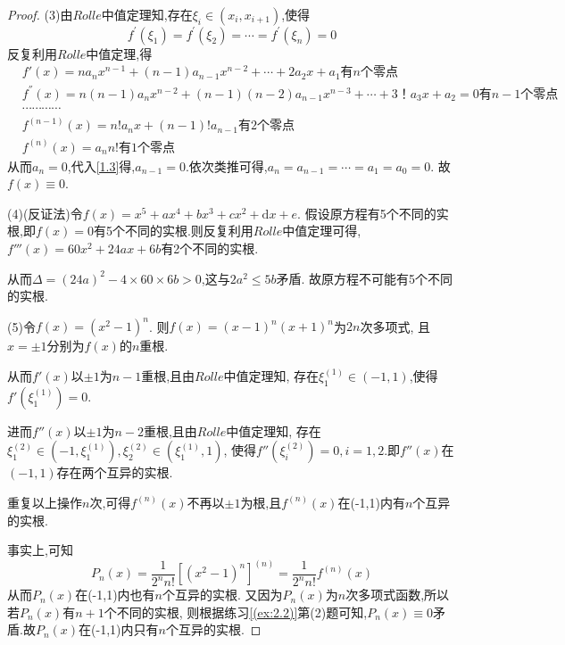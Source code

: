 \documentclass[lang=cn,newtx,10pt,scheme=chinese]{../Template/elegantbook}
\begin{document}
\begin{exercise}
\begin{proof}
    (3)由$Rolle$中值定理知,存在$\xi_i\in(x_i,x_{i+1})$,使得
    \begin{equation}
        f^{\prime}\left( \xi _1 \right) =f^{\prime}\left( \xi _2 \right) =\cdots =f^{\prime}\left( \xi _n \right) =0
        \nonumber
    \end{equation}
    反复利用$Rolle$中值定理,得
    \begin{align}
            &f'\left( x \right) =na_nx^{n-1}+\left( n-1 \right) a_{n-1}x^{n-2}+\cdots +2a_2x+a_1\text{有}n\text{个零点}
            \\
            &f^{''}(x)=n\left( n-1 \right) a_nx^{n-2}+\left( n-1 \right) \left( n-2 \right) a_{n-1}x^{n-3}+\cdots +3\text{！}a_3x+a_2=0\text{有}n-1\text{个零点}
            \\
            &\cdots \cdots \cdots \cdots \nonumber
            \\
            &f^{(n-1)}(x)=n!a_nx+\left( n-1 \right) !a_{n-1}\text{有}2\text{个零点} \label{1.3}
            \\
            &f^{(n)}(x)=a_nn!\text{有}1\text{个零点}
    \end{align}
    从而$a_n=0$,代入\eqref{1.3}得,$a_{n-1}=0$.依次类推可得,$a_n=a_{n-1}=\cdots=a_1=a_0=0$.
    故$f(x)\equiv 0$.

    (4)(反证法)令$f(x)=x^5+ax^4+bx^3+cx^2+\mathrm{d}x+e$.
    假设原方程有5个不同的实根,即$f(x)=0$有5个不同的实根.则反复利用$Rolle$中值定理可得,
    $f'''(x)=60x^2+24ax+6b$有2个不同的实根.
    
    从而$\Delta=(24a)^2-4\times 60\times 6b>0$,这与$2a^2\le 5b$矛盾.
    故原方程不可能有5个不同的实根.

    (5)令$f(x)=\left( x^2-1 \right) ^n$.
    则$f(x)=\left( x-1 \right) ^n\left( x+1 \right) ^n$为$2n$次多项式,
    且$x=\pm1$分别为$f(x)$的$n$重根.

    从而$f'(x)$以$\pm1$为$n-1$重根,且由$Rolle$中值定理知,
    存在$\xi _{1}^{(1)}\in(-1,1)$,使得$f'(\xi _{1}^{(1)})=0$.

    进而$f''(x)$以$\pm1$为$n-2$重根,且由$Rolle$中值定理知,
    存在$\xi _{1}^{(2)}\in(-1,\xi _{1}^{(1)}),\xi _{2}^{(2)}\in(\xi _{1}^{(1)},1)$,
    使得$f''(\xi _{i}^{(2)})=0,i=1,2$.即$f''(x)$在$(-1,1)$存在两个互异的实根.

    重复以上操作$n$次,可得$f^{(n)}(x)$不再以$\pm1$为根,且$f^{(n)}(x)$在(-1,1)内有$n$个互异的实根.

    事实上,可知
    \begin{equation}
        P_n\left( x \right) =\frac{1}{2^nn!}\left[ \left( x^2-1 \right) ^n \right] ^{\left( n \right)}
        =\frac{1}{2^nn!}f^{(n)}(x)
        \nonumber
    \end{equation}
    从而$P_n(x)$在(-1,1)内也有$n$个互异的实根.
    又因为$P_n(x)$为$n$次多项式函数,所以若$P_n(x)$有$n+1$个不同的实根,
    则根据练习\eqref{(ex:2.2)}第(2)题可知,$P_n(x)\equiv 0$矛盾.故$P_n(x)$在(-1,1)内只有$n$个互异的实根.


\end{proof}
\end{exercise}
\end{document}
